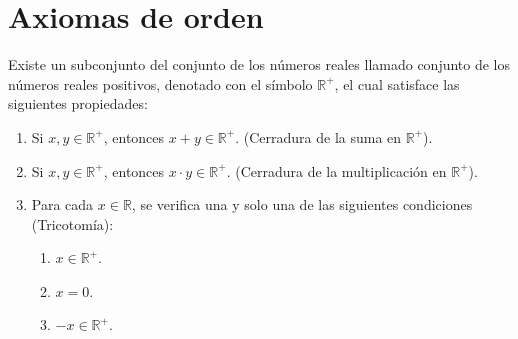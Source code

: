 \documentclass[11pt]{article}
\newcommand{\R}{\mathbb{R}}
\begin{document}
\part*{Axiomas de orden}

%
Existe un subconjunto del conjunto de los números reales llamado conjunto de los números reales positivos, denotado con el símbolo $\R^+$, el cual satisface las siguientes propiedades:%
\vspace{-1em} \begin{enumerate}[start=12]%
\item Si $x, y \in \R^+$, entonces $x + y \in \R^+$. (Cerradura de la suma en $\R^+$).
\item Si $x, y \in \R^+$, entonces $x \cdot y \in \R^+$. (Cerradura de la multiplicación en $\R^+$).
\item Para cada $x\in \R$, se verifica una y solo una de las siguientes condiciones (Tricotomía):
\begin{enumerate}[label=\roman*)]
\item $x \in \R^+$.
\item $x = 0$.
\item $-x \in \R^+$.
\end{enumerate}
\end{enumerate}
\end{document}
